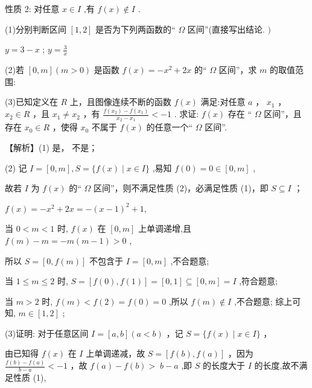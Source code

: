 \documentclass[10pt]{article}
\newcommand*\circled[1]{\tikz[baseline=(char.base)]{\node[shape=circle,draw,inner sep=1.5pt] (char) {\small #1};}}
\begin{document}
性质 2: 对任意 \(x \in  I\) ,有 \(f\left( x\right)  \notin  I\) .

(1)分别判断区间 \(\left\lbrack  {1,2}\right\rbrack\) 是否为下列两函数的“ \(\Omega\) 区间”(直接写出结论. \()\)

 \circled{1}  \(y = 3 - x\) ;  \circled{2}  \(y = \frac{3}{x}\)

(2)若 \(\left\lbrack  {0,m}\right\rbrack  \left( {m > 0}\right)\) 是函数 \(f\left( x\right)  =  - {x}^{2} + {2x}\) 的“ \(\Omega\) 区间”，求 \(m\) 的取值范围:

(3)已知定义在 \(R\) 上，且图像连续不断的函数 \(f\left( x\right)\) 满足:对任意 \(a\) ， \({x}_{1}\) ， \({x}_{2} \in  R\) ，且 \({x}_{1} \neq  {x}_{2}\) ，有 \(\frac{f\left( {x}_{2}\right)  - f\left( {x}_{1}\right) }{{x}_{2} - {x}_{1}} <  - 1\) . 求证: \(f\left( x\right)\) 存在 “ \(\Omega\) 区间”，且存在 \({x}_{0} \in  R\) ，使得 \({x}_{0}\) 不属于 \(f\left( x\right)\) 的任意一个“ \(\Omega\) 区间”.

【解析】(1)  \circled{1} 是， \circled{2} 不是；

(2) 记 \(I = \left\lbrack  {0,m}\right\rbrack  ,S = \{ f\left( x\right)  \mid  x \in  I\}\) ,易知 \(f\left( 0\right)  = 0 \in  \left\lbrack  {0,m}\right\rbrack\) ,

故若 \(I\) 为 \(f\left( x\right)\) 的“ \(\Omega\) 区间”，则不满足性质 (2)，必满足性质 (1)，即 \(S \subseteq  I\) ；

\(f\left( x\right)  =  - {x}^{2} + {2x} =  - {\left( x - 1\right) }^{2} + 1,\)

当 \(0 < m < 1\) 时, \(f\left( x\right)\) 在 \(\left\lbrack  {0,m}\right\rbrack\) 上单调递增,且 \(f\left( m\right)  - m =  - m\left( {m - 1}\right)  > 0\) ,

所以 \(S = \left\lbrack  {0,f\left( m\right) }\right\rbrack\) 不包含于 \(I = \left\lbrack  {0,m}\right\rbrack\) ,不合题意;

当 \(1 \leq  m \leq  2\) 时, \(S = \left\lbrack  {f\left( 0\right) ,f\left( 1\right) }\right\rbrack   = \left\lbrack  {0,1}\right\rbrack   \subseteq  \left\lbrack  {0,m}\right\rbrack   = I\) ,符合题意;

当 \(m > 2\) 时, \(f\left( m\right)  < f\left( 2\right)  = f\left( 0\right)  = 0\) ,所以 \(f\left( m\right)  \notin  I\) ,不合题意; 综上可知, \(m \in  \left\lbrack  {1,2}\right\rbrack\) ;

(3)证明: 对于任意区间 \(I = \left\lbrack  {a,b}\right\rbrack  \left( {a < b}\right)\) ，记 \(S = \{ f\left( x\right)  \mid  x \in  I\}\) ，

由已知得 \(f\left( x\right)\) 在 \(I\) 上单调递减，故 \(S = \left\lbrack  {f\left( b\right) ,f\left( a\right) }\right\rbrack\) ，因为 \(\frac{f\left( b\right)  - f\left( a\right) }{b - a} <  - 1\) ，故 \(f\left( a\right)  - f\left( b\right)  > \; b - a\) ,即 \(S\) 的长度大于 \(I\) 的长度,故不满足性质 (1),
\end{document}
